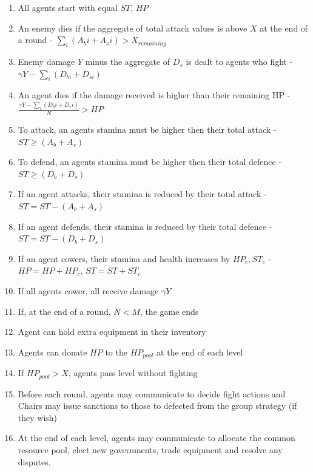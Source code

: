 \begin{enumerate}
    \item All agents start with equal $ST$, $HP$
    \item An enemy dies if the aggregate of total attack values is above $X$ at the end of a round - $\sum_{i} (A_bi + A_si) > X_{remaining}$
    \item Enemy damage $Y$ minus the aggregate of $D_s$ is dealt to agents who fight - $\gamma Y - \sum_{i} (D_{bi} + D_{si})$
    \item An agent dies if the damage received is higher than their remaining HP -  $\frac{\gamma Y - \sum_{i} (D_bi + D_si)}{N} > HP$
    \item To attack, an agents stamina must be higher then their total attack - $ST \geq (A_b + A_s)$
    \item To defend, an agents stamina must be higher then their total defence - $ST \geq (D_b + D_s)$
    \item If an agent attacks, their stamina is reduced by their total attack -  $ST = ST - (A_b + A_s)$
    \item If an agent defends, their stamina is reduced by their total defence - $ST = ST - (D_b + D_s)$
    \item If an agent cowers, their stamina and health increases by $HP_c, ST_c$ - $HP = HP + HP_c$, $ST = ST + ST_c$
    \item If all agents cower, all receive damage $\gamma Y$
    \item If, at the end of a round, $N<M$, the game ends 

    \item Agent can hold extra equipment in their inventory
    \item Agents can donate $HP$ to the $HP_{pool}$ at the end of each level
    \item If $HP_{pool} > X$, agents pass level without fighting

    \item Before each round, agents may communicate to decide fight actions and Chairs may issue sanctions to those to defected from the group strategy (if they wish)
    \item At the end of each level, agents may communicate to allocate the common resource pool, elect new governments, trade equipment and resolve any disputes.


\end{enumerate}


